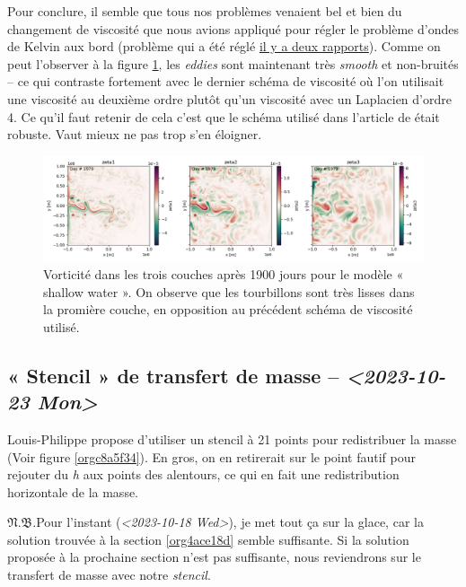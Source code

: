 \documentclass[10pt]{article}
\numberwithin{equation}{section}
\newcommand{\pt}{\hspace{1pt}} %
\newcommand{\nb}{\underline{{\footnotesize\EightStarConvex}\pt $\mathfrak{N.B.}$\vphantom{p}}\hspace{3pt}}
\begin{document}
Pour conclure, il semble que tous nos problèmes venaient bel et bien du changement de viscosité que nous avions appliqué pour régler le problème d'ondes de Kelvin aux bord (problème qui a été réglé \href{rapport-2023-10-06.pdf}{il y a deux rapports}).
Comme on peut l'observer à la figure \ref{fig:org0bd87f1}, les \emph{eddies} sont maintenant très \emph{smooth} et non-bruités -- ce qui contraste fortement avec le dernier schéma de viscosité où l'on utilisait une viscosité au deuxième ordre plutôt qu'un viscosité avec un Laplacien d'ordre 4.
Ce qu'il faut retenir de cela c'est que le schéma utilisé dans l'article de \Textcite{chen_2021} était robuste.
Vaut mieux ne pas trop s'en éloigner. 

\begin{figure}[htbp]
\centering
\includegraphics[width=.9\linewidth]{figures/debuggage/2023_10_17_smooth_zeta.png}
\caption{\label{fig:org0bd87f1}Vorticité dans les trois couches après 1900 jours pour le modèle « shallow water ». On observe que les tourbillons sont très lisses dans la promière couche, en opposition au précédent schéma de viscosité utilisé.}
\end{figure}
\subsection{« Stencil » de transfert de masse -- \textit{<2023-10-23 Mon>}}
\label{sec:org474ebb7}
\label{org539badb}

Louis-Philippe propose d'utiliser un stencil à 21 points pour redistribuer la masse (Voir figure \ref{orgc8a5f34}).
En gros, on en retirerait sur le point fautif pour rejouter du \emph{h} aux points des alentours, ce qui en fait une redistribution horizontale de la masse.\bigskip

\nb Pour l'instant (\textit{<2023-10-18 Wed>}), je met tout ça sur la glace, car la solution trouvée à la section \ref{org4ace18d} semble suffisante.
Si la solution proposée à la prochaine section n'est pas suffisante, nous reviendrons sur le transfert de masse avec notre \emph{stencil}. 
\end{document}
